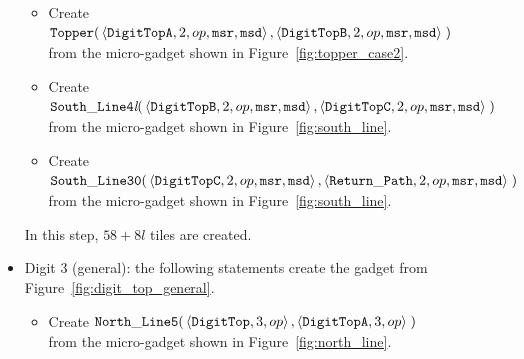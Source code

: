 \begin{itemize}
\begin{itemize}
            \item Create
            $\begin{aligned}[t]
                {\tt Topper}(& \left\langle {\tt DigitTopA}, 2, op, {\tt msr}, {\tt msd} \right\rangle,
                               \left\langle {\tt DigitTopB}, 2, op, {\tt msr}, {\tt msd} \right\rangle \;)
            \end{aligned}$\\from the micro-gadget shown in Figure~\ref{fig:topper_case2}.

            \item Create
            $\begin{aligned}[t]
                {\tt South\_Line4\textit{l}}(& \left\langle {\tt DigitTopB}, 2, op, {\tt msr}, {\tt msd} \right\rangle,
                                               \left\langle {\tt DigitTopC}, 2, op, {\tt msr}, {\tt msd} \right\rangle \;)
            \end{aligned}$\\from the micro-gadget shown in Figure~\ref{fig:south_line}.

            \item Create
            $\begin{aligned}[t]
                {\tt South\_Line30}(& \left\langle {\tt DigitTopC}, 2, op, {\tt msr}, {\tt msd} \right\rangle,
                                      \left\langle {\tt Return\_Path},     2, op, {\tt msr}, {\tt msd}\right\rangle \;)
            \end{aligned}$\\from the micro-gadget shown in Figure~\ref{fig:south_line}.
        \end{itemize}
        In this step, $58 + 8l$ tiles are created.
        \vspace{1cm}


        \item Digit 3 (general): the following statements create the gadget from Figure~\ref{fig:digit_top_general}.
        \begin{itemize}
            \item Create
            $\begin{aligned}[t]
                {\tt North\_Line5}(& \left\langle {\tt DigitTop},  3, op \right\rangle,
                                     \left\langle {\tt DigitTopA}, 3, op \right\rangle \;)
            \end{aligned}$\\from the micro-gadget shown in Figure~\ref{fig:north_line}.


\end{itemize}
\end{itemize}
